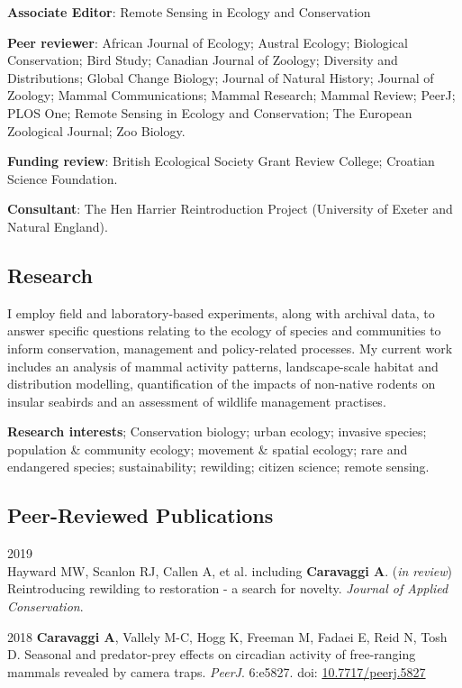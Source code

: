 \documentclass[]{article}
\begin{document}
\textbf{Associate Editor}: Remote Sensing in Ecology and Conservation

\textbf{Peer reviewer}: African Journal of Ecology; Austral Ecology;
Biological Conservation; Bird Study; Canadian Journal of Zoology;
Diversity and Distributions; Global Change Biology; Journal of Natural
History; Journal of Zoology; Mammal Communications; Mammal Research;
Mammal Review; PeerJ; PLOS One; Remote Sensing in Ecology and
Conservation; The European Zoological Journal; Zoo Biology.

\textbf{Funding review}: British Ecological Society Grant Review
College; Croatian Science Foundation.

\textbf{Consultant}: The Hen Harrier Reintroduction Project (University
of Exeter and Natural England).

\subsection{Research}\label{research}

I employ field and laboratory-based experiments, along with archival
data, to answer specific questions relating to the ecology of species
and communities to inform conservation, management and policy-related
processes. My current work includes an analysis of mammal activity
patterns, landscape-scale habitat and distribution modelling,
quantification of the impacts of non-native rodents on insular seabirds
and an assessment of wildlife management practises.

\textbf{Research interests}; Conservation biology; urban ecology;
invasive species; population \& community ecology; movement \& spatial
ecology; rare and endangered species; sustainability; rewilding; citizen
science; remote sensing.

\subsection{Peer-Reviewed
Publications}\label{peer-reviewed-publications}

2019\\
Hayward MW, Scanlon RJ, Callen A, et al. including \textbf{Caravaggi A}.
(\emph{in review}) Reintroducing rewilding to restoration - a search for
novelty. \emph{Journal of Applied Conservation}.

2018 \textbf{Caravaggi A}, Vallely M-C, Hogg K, Freeman M, Fadaei E,
Reid N, Tosh D. Seasonal and predator-prey effects on circadian activity
of free-ranging mammals revealed by camera traps. \emph{PeerJ}. 6:e5827.
doi: \href{https://doi.org/10.7717/peerj.5827}{10.7717/peerj.5827}
\end{document}
